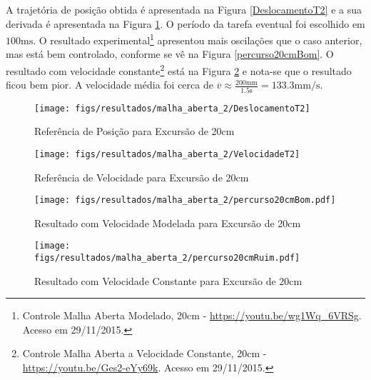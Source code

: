 A trajetória de posição obtida é apresentada na Figura \ref{DeslocamentoT2} e a sua derivada é apresentada na Figura \ref{VelocidadeT2}. O período da tarefa eventual foi escolhido em $100\mathrm{ms}$. O resultado experimental\footnote{Controle Malha Aberta Modelado, 20cm - \url{https://youtu.be/wg1Wq_6VRSg}. Acesso em 29/11/2015.} apresentou mais oscilações que o caso anterior, mas está bem controlado, conforme se vê na Figura \ref{percurso20cmBom}. O resultado com velocidade constante\footnote{Controle Malha Aberta a Velocidade Constante, 20cm - \url{https://youtu.be/Ges2-eYy69k}. Acesso em 29/11/2015.} está na Figura \ref{percurso20cmRuim} e nota-se que o resultado ficou bem pior. A velocidade média foi cerca de $\overline{v} \approx \frac{200\mathrm{mm}}{1.5\mathrm{s}} = 133.3\mathrm{mm}/\mathrm{s}$.

\begin{figure}[!htb]
    \centering
    \begin{minipage}{.45\textwidth}
        \centering
        \texttt{[image: figs/resultados/malha\_aberta\_2/DeslocamentoT2]}
        \caption{Referência de Posição para Excursão de 20cm}
        \label{DeslocamentoT2}
    \end{minipage}%
    \hspace{0.1cm}
    \begin{minipage}{0.45\textwidth}
        \centering
        \texttt{[image: figs/resultados/malha\_aberta\_2/VelocidadeT2]}
        \caption{Referência de Velocidade para Excursão de 20cm}
        \label{VelocidadeT2}
    \end{minipage}
\end{figure}

\begin{figure}[!htb]
    \centering
    \begin{minipage}{.45\textwidth}
        \centering
        \texttt{[image: figs/resultados/malha\_aberta\_2/percurso20cmBom.pdf]}
        \caption{Resultado com Velocidade Modelada para Excursão de 20cm}
        \label{percurso20cmBom}
    \end{minipage}%
    \hspace{0.1cm}
    \begin{minipage}{0.45\textwidth}
        \centering
        \texttt{[image: figs/resultados/malha\_aberta\_2/percurso20cmRuim.pdf]}
        \caption{Resultado com Velocidade Constante para Excursão de 20cm}
        \label{percurso20cmRuim}
    \end{minipage}
\end{figure}






